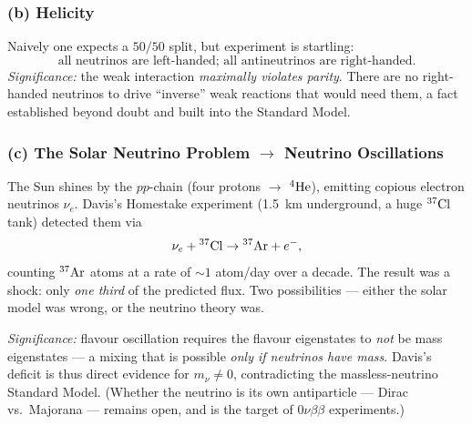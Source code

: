 
\subsubsection*{(b) Helicity}
Naively one expects a $50/50$ split, but experiment is startling:
\begin{equation}
  \label{eq:lec09:nu_helicity}
  \boxed{\text{all neutrinos are left-handed;\ all antineutrinos are right-handed.}}
\end{equation}
\textit{Significance:} the weak interaction \emph{maximally violates parity}.
There are no right-handed neutrinos to drive ``inverse'' weak reactions that
would need them, a fact established beyond doubt and built into the Standard
Model.

\subsubsection*{(c) The Solar Neutrino Problem $\to$ Neutrino Oscillations}
The Sun shines by the $pp$-chain (four protons $\to$ $\nucleus{He}{4}$), emitting
copious electron neutrinos $\nu_e$. Davis's Homestake experiment (1.5~km
underground, a huge $\nucleus{Cl}{37}$ tank) detected them via
\begin{equation}
  \label{eq:lec09:davis}
  \nu_e + \nucleus{Cl}{37} \to \nucleus{Ar}{37} + e^-,
\end{equation}
counting $\nucleus{Ar}{37}$ atoms at a rate of $\sim1$ atom/day over a decade.
The result was a shock: only \emph{one third} of the predicted flux. Two
possibilities --- either the solar model was wrong, or the neutrino theory was.

\textit{Significance:} flavour oscillation requires the flavour eigenstates to
\emph{not} be mass eigenstates --- a mixing that is possible \emph{only if
neutrinos have mass}. Davis's deficit is thus direct evidence for $m_\nu\neq0$,
contradicting the massless-neutrino Standard Model. (Whether the neutrino is its
own antiparticle --- Dirac vs.\ Majorana --- remains open, and is the target of
$0\nu\beta\beta$ experiments.)

